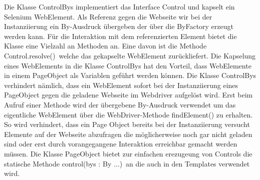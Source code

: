 Die Klasse ControlBys implementiert das Interface Control und kapselt ein Selenium WebElement. Als Referenz gegen die Webseite wir bei der Instanziierung ein By-Ausdruck übergeben der über die ByFactory erzeugt werden kann.
Für die Interaktion mit dem referenzierten Element bietet die Klasse eine Vielzahl an Methoden an. Eine davon ist die Methode \grq Control.resolve()\grq\
welche das gekapselte WebElement zurückliefert.
Die Kapselung eines WebElements in die Klasse ControlBys hat den Vorteil, dass WebElemente in einem PageObject als Variablen geführt werden können.
Die Klasse ControlBys verhindert nämlich, dass ein WebElement sofort bei der Instanziierung eines PageObject gegen die geladene Webseite im Webdriver aufgelöst wird. Erst beim Aufruf einer Methode wird der übergebene By-Ausdruck verwendet um das eigentliche WebElement über die WebDriver-Methode findElement() zu erhalten.
So wird verhindert, dass ein Page Object bereits bei der Instanziierung versucht Elemente auf der Webseite abzufragen die möglicherweise noch gar nicht geladen sind oder erst durch vorangegangene Interaktion erreichbar gemacht werden müssen. Die Klasse PageObject bietet zur einfachen erezugeung von Controls die statische Methode \grq control(bys : By ...)\grq\ an die auch in den Templates verwendet wird.


